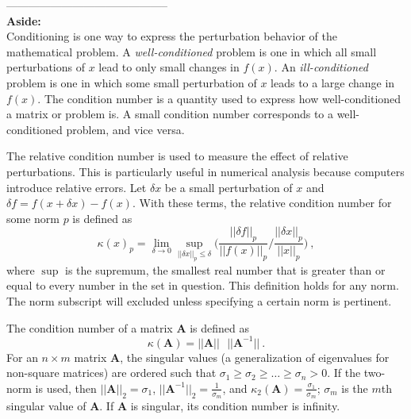 \documentclass[12pt]{article}
\newcommand{\ve}[1]{\ensuremath{\mathbf{#1}}}
\begin{document}
--------------------------------------------\\
\textbf{Aside:}\\
Conditioning is one way to express the perturbation behavior of the mathematical problem. A \emph{well-conditioned} problem is one in which all small perturbations of $x$ lead to only small changes in $f(x)$. An \emph{ill-conditioned} problem is one in which some small perturbation of $x$ leads to a large change in $f(x)$. The condition number is a quantity used to express how well-conditioned a matrix or problem is. A small condition number corresponds to a well-conditioned problem, and vice versa. 

The relative condition number is used to measure the effect of relative perturbations. This is particularly useful in numerical analysis because computers introduce relative errors. Let $\delta x$ be a small perturbation of $x$ and $\delta f = f(x + \delta x) - f(x)$. With these terms, the relative condition number for some norm $p$ is defined as
%
\begin{equation}
  \kappa(x)_{p} = \lim_{\delta \rightarrow 0} \sup_{||\delta x||_{p} \le \delta} \biggl(\frac{||\delta f||_{p}}{||f(x)||_{p}} / \frac{||\delta x||_{p}}{||x||_{p}} \biggr)  \:,
  \label{eq:cond}
\end{equation}
%
where $\sup$ is the supremum, the smallest real number that is greater than or equal to every number in the set in question. %
This definition holds for any norm. The norm subscript will excluded unless specifying a certain norm is pertinent.

The condition number of a matrix $\mathbf{A}$ is defined as
%
\begin{equation}
  \kappa(\mathbf{A}) = ||\mathbf{A}|| \text{ }||\mathbf{A}^{-1}|| \:.
  \label{eq:condA}
\end{equation}
%
For an $n \times m$ matrix $\ve{A}$, the singular values (a generalization of eigenvalues for non-square matrices) are ordered such that $\sigma_{1} \ge \sigma_{2} \ge \dots \ge \sigma_{n} > 0$. If the two-norm is used, then $||\mathbf{A}||_{2} = \sigma_{1}$, $||\mathbf{A}^{-1}||_{2} = \frac{1}{\sigma_{m}}$, and $\kappa_{2}(\mathbf{A}) = \frac{\sigma_{1}}{\sigma_{m}}$; $\sigma_{m}$ is the $m$th singular value of $\ve{A}$. If $\mathbf{A}$ is singular, its condition number is infinity. 
\end{document}
